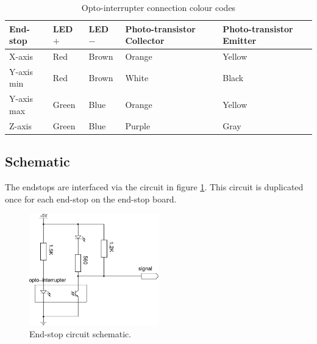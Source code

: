 			\begin{table}[p]
				\centering
				\begin{tabular}{l l l l l}
					\toprule
					End-stop & LED $+$ & LED $-$ & Photo-transistor Collector & Photo-transistor Emitter \\
					\midrule
					X-axis     & Red    & Brown  & Orange & Yellow \\
					\addlinespace
					Y-axis min & Red    & Brown  & White  & Black  \\
					Y-axis max & Green  & Blue   & Orange & Yellow \\
					\addlinespace
					Z-axis     & Green  & Blue   & Purple & Gray   \\
					\bottomrule
				\end{tabular}
				
				\caption{Opto-interrupter connection colour codes}
				\label{tab:endstopoptoconnect}
			\end{table}
			
			
		\subsection{Schematic}
			
			\label{sec:endstopDiagram}
			
			The endstops are interfaced via the circuit in figure
			\ref{fig:endstopschem}. This circuit is duplicated once for each end-stop
			on the end-stop board.
			
			\begin{figure}[p]
				\center
				\includegraphics[width=0.5\textwidth]{circuits/endstop.pdf}
				\caption{End-stop circuit schematic.}
				\label{fig:endstopschem}
			\end{figure}
